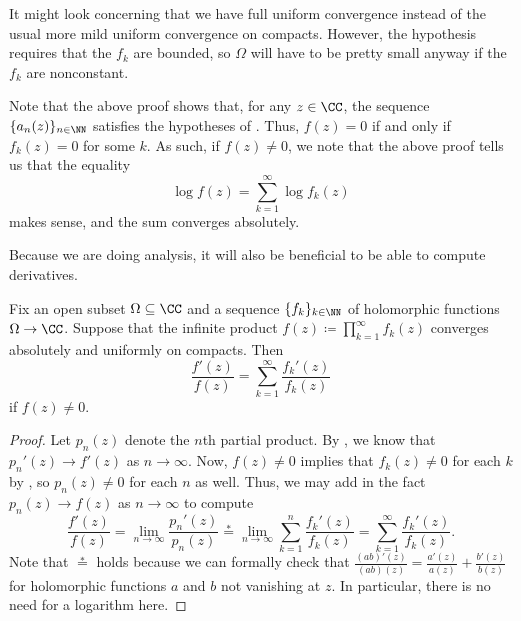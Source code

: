 \documentclass[notes.tex]{subfiles}
\begin{document}
\begin{remark}
	It might look concerning that we have full uniform convergence instead of the usual more mild uniform convergence on compacts. However, the hypothesis requires that the $f_k$ are bounded, so $\Omega$ will have to be pretty small anyway if the $f_k$ are nonconstant.
\end{remark}
\begin{remark} \label{rem:vanishing-prod-in-abs-conv}
	Note that the above proof shows that, for any $z\in\CC$, the sequence $\{a_n(z)\}_{n\in\NN}$ satisfies the hypotheses of . Thus, $f(z)=0$ if and only if $f_k(z)=0$ for some $k$. As such, if $f(z)\ne0$, we note that the above proof tells us that the equality
	\[\log f(z)=\sum_{k=1}^\infty\log f_k(z)\]
	makes sense, and the sum converges absolutely.
\end{remark}
Because we are doing analysis, it will also be beneficial to be able to compute derivatives.
\begin{corollary} \label{cor:deriv-inf-prod}
	Fix an open subset $\Omega\subseteq\CC$ and a sequence $\{f_k\}_{k\in\NN}$ of holomorphic functions $\Omega\to\CC$. Suppose that the infinite product $f(z)\coloneqq\prod_{k=1}^\infty f_k(z)$ converges absolutely and uniformly on compacts. Then
	\[\frac{f'(z)}{f(z)}=\sum_{k=1}^\infty\frac{f_k'(z)}{f_k(z)}\]
	if $f(z)\ne0$.
\end{corollary}
\begin{proof}
	Let $p_n(z)$ denote the $n$th partial product. By , we know that $p_n'(z)\to f'(z)$ as $n\to\infty$. Now, $f(z)\ne0$ implies that $f_k(z)\ne0$ for each $k$ by , so $p_n(z)\ne0$ for each $n$ as well. Thus, we may add in the fact $p_n(z)\to f(z)$ as $n\to\infty$ to compute
	\[\frac{f'(z)}{f(z)}=\lim_{n\to\infty}\frac{p_n'(z)}{p_n(z)}\stackrel*=\lim_{n\to\infty}\sum_{k=1}^n\frac{f_k'(z)}{f_k(z)}=\sum_{k=1}^\infty\frac{f_k'(z)}{f_k(z)}.\]
	Note that $\stackrel*=$ holds because we can formally check that $\frac{(ab)'(z)}{(ab)(z)}=\frac{a'(z)}{a(z)}+\frac{b'(z)}{b(z)}$ for holomorphic functions $a$ and $b$ not vanishing at $z$. In particular, there is no need for a logarithm here.
\end{proof}
\end{document}
